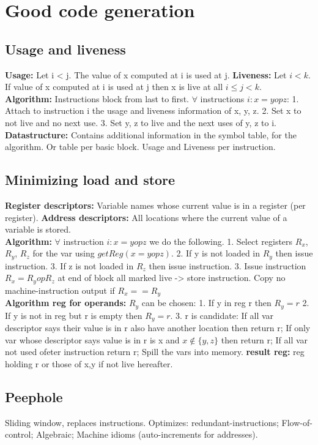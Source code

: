 \section{Good code generation}
\subsection*{Usage and liveness}
\textbf{Usage:} Let i < j. The value of x computed at i is used at j. \textbf{Liveness:} Let $i < k$. If value of x computed at i is used at j then x is live at all $i \leqslant j < k$.\\
\textbf{Algorithm:} Instructions block from last to first. $\forall$ instructions $i: x = y op z$: 1. Attach to instruction i the usage and liveness information of x, y, z. 2. Set x to not live and no next use. 3. Set y, z to live and the next uses of y, z to i.\\
\textbf{Datastructure:} Contains additional information in the symbol table, for the algorithm. Or table per basic block. Usage and Liveness per instruction.
\subsection*{Minimizing load and store}
\textbf{Register descriptors:} Variable names whose current value is in a register (per register). \textbf{Address descriptors:} All locations where the current value of a variable is stored.\\
\textbf{Algorithm:} $\forall$ instruction $i: x = y op z$ we do the following. 1. Select registers $R_x$, $R_y$, $R_z$ for the var using $getReg(x = y op z)$. 2. If y is not loaded in $R_y$ then issue instruction. 3. If z is not loaded in $R_z$ then issue instruction. 3. Issue instruction $R_x = R_y op R_z$ at end of block all marked live -> store instruction. Copy no machine-instruction output if $R_x == R_y$\\
\textbf{Algorithm reg for operands:} $R_y$ can be chosen: 1. If y in reg r then $R_y = r$ 2. If y is not in reg but r is empty then $R_y = r$. 3. r is candidate: If all var descriptor says their value is in r also have another location then return r; If only var whose descriptor says value is in r is x and $x \notin \{y,z\}$ then return r; If all var not used ofeter instruction return r; Spill the vars into memory. \textbf{result reg:} reg holding r or those of x,y if not live hereafter.
\subsection*{Peephole}
Sliding window, replaces instructions. Optimizes: redundant-instructions; Flow-of-control; Algebraic; Machine idioms (auto-increments for addresses).
